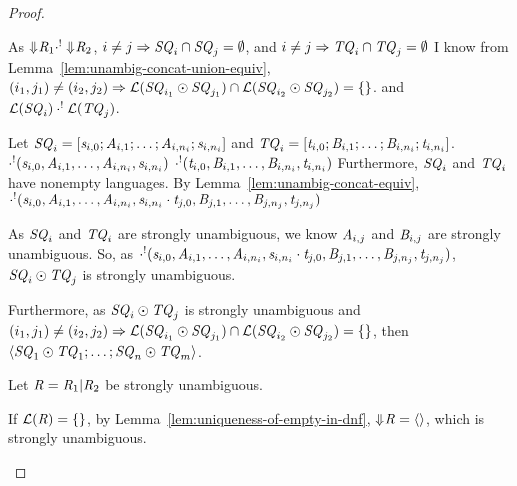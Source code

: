 \documentclass[numbers,10pt,preprint\ifanon ,nocopyrightspace\fi]{sigplanconf}
\begin{document}
\begin{proof}
\begin{case}[\ConcatRegexType{}]
    As $\Downarrow\mkern-4mu \mathit{R}_1 \cdot^! \Downarrow\mkern-4mu \mathit{R}_2$,
    $i \neq j \Rightarrow \mathit{SQ}_i \cap \mathit{SQ}_j = \emptyset$, and
    $i \neq j \Rightarrow \mathit{TQ}_i \cap \mathit{TQ}_j = \emptyset$
    I know from Lemma~\ref{lem:unambig-concat-union-equiv},
    $(i_1,j_1) \neq (i_2,j_2) \Rightarrow \mathcal{L}(\mathit{SQ}_{i_1} \odot
    \mathit{SQ}_{j_1}) \cap
    \mathcal{L}(\mathit{SQ}_{i_2} \odot
    \mathit{SQ}_{j_2}) = \{\}$.
    and $\mathcal{L}(\mathit{SQ}_i) \cdot^! \mathcal{L}(\mathit{TQ}_j)$.

    Let $\mathit{SQ}_i =
    [\mathit{s}_{i,0};\mathit{A}_{i,1};\ldots;\mathit{A}_{i,n_i};\mathit{s}_{i,n_i}]$ and
    $\mathit{TQ}_i =
    [\mathit{t}_{i,0};\mathit{B}_{i,1};\ldots;\mathit{B}_{i,n_i};\mathit{t}_{i,n_i}]$.
    $\cdot^!(\mathit{s}_{i,0},\mathit{A}_{i,1},\ldots,\mathit{A}_{i,n_i},\mathit{s}_{i,n_i})$
    $\cdot^!(\mathit{t}_{i,0},\mathit{B}_{i,1},\ldots,\mathit{B}_{i,n_i},\mathit{t}_{i,n_i})$
    Furthermore, $\mathit{SQ}_i$ and $\mathit{TQ}_i$ have nonempty languages.
    By Lemma~\ref{lem:unambig-concat-equiv},
    $\cdot^!(\mathit{s}_{i,0},\mathit{A}_{i,1},\ldots,\mathit{A}_{i,n_i},
      \mathit{s}_{i,n_i}\cdot\mathit{t}_{j,0},
      \mathit{B}_{j,1},\ldots,\mathit{B}_{j,n_j},\mathit{t}_{j,n_j})$
    
    As $\mathit{SQ}_i$ and $\mathit{TQ}_i$ are strongly unambiguous, we know
    $\mathit{A}_{i,j}$ and $\mathit{B}_{i,j}$ are strongly unambiguous.
    So, as $\cdot^!(\mathit{s}_{i,0},\mathit{A}_{i,1},\ldots,\mathit{A}_{i,n_i},
      \mathit{s}_{i,n_i}\cdot\mathit{t}_{j,0},
      \mathit{B}_{j,1},\ldots,\mathit{B}_{j,n_j},\mathit{t}_{j,n_j})$,
    $\mathit{SQ}_i \odot \mathit{TQ}_j$ is strongly unambiguous.

    Furthermore, as 
    $\mathit{SQ}_i \odot \mathit{TQ}_j$ is strongly unambiguous and
    $(i_1,j_1) \neq (i_2,j_2) \Rightarrow \mathcal{L}(\mathit{SQ}_{i_1} \odot
    \mathit{SQ}_{j_1}) \cap
    \mathcal{L}(\mathit{SQ}_{i_2} \odot
      \mathit{SQ}_{j_2}) = \{\}$, then
    $\langle\mathit{SQ}_1 \odot \mathit{TQ}_1 ;\ldots;
    \mathit{SQ}_n \odot \mathit{TQ}_m\rangle$.
  \end{case}

  \begin{case}[\OrRegexType{}]
    Let $\mathit{R} = \mathit{R}_1 | \mathit{R}_2$ be strongly unambiguous.

    If $\mathcal{L}(\mathit{R}) = \{\}$, by
    Lemma~\ref{lem:uniqueness-of-empty-in-dnf}, $\Downarrow\mkern-4mu \mathit{R} =
    \langle\rangle$, which is strongly unambiguous.


\end{case}
\end{proof}
\end{document}
